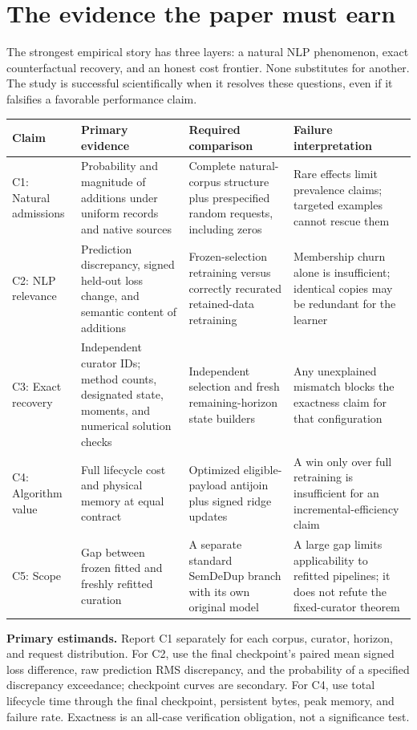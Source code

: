 \documentclass[11pt,a4paper]{article}
\newcommand{\smalltable}{\small\renewcommand{\arraystretch}{1.14}}
\begin{document}
\newpage
\begingroup\small\setlength{\parskip}{0pt}\tableofcontents\endgroup
\newpage

\section{The evidence the paper must earn}
The strongest empirical story has three layers: a natural NLP phenomenon, exact counterfactual recovery, and an honest cost frontier. None substitutes for another. The study is successful scientifically when it resolves these questions, even if it falsifies a favorable performance claim.

{\smalltable
\begin{longtable}{p{.12\linewidth}p{.24\linewidth}p{.32\linewidth}p{.23\linewidth}}
\toprule Claim & Primary evidence & Required comparison & Failure interpretation\\\midrule\endhead
C1: Natural admissions & Probability and magnitude of additions under uniform records and native sources & Complete natural-corpus structure plus prespecified random requests, including zeros & Rare effects limit prevalence claims; targeted examples cannot rescue them\\
C2: NLP relevance & Prediction discrepancy, signed held-out loss change, and semantic content of additions & Frozen-selection retraining versus correctly recurated retained-data retraining & Membership churn alone is insufficient; identical copies may be redundant for the learner\\
C3: Exact recovery & Independent curator IDs; method counts, designated state, moments, and numerical solution checks & Independent selection and fresh remaining-horizon state builders & Any unexplained mismatch blocks the exactness claim for that configuration\\
C4: Algorithm value & Full lifecycle cost and physical memory at equal contract & Optimized eligible-payload antijoin plus signed ridge updates & A win only over full retraining is insufficient for an incremental-efficiency claim\\
C5: Scope & Gap between frozen fitted and freshly refitted curation & A separate standard SemDeDup branch with its own original model & A large gap limits applicability to refitted pipelines; it does not refute the fixed-curator theorem\\
\bottomrule
\end{longtable}}

\textbf{Primary estimands.} Report C1 separately for each corpus, curator, horizon, and request distribution. For C2, use the final checkpoint's paired mean signed loss difference, raw prediction RMS discrepancy, and the probability of a specified discrepancy exceedance; checkpoint curves are secondary. For C4, use total lifecycle time through the final checkpoint, persistent bytes, peak memory, and failure rate. Exactness is an all-case verification obligation, not a significance test.
\end{document}
